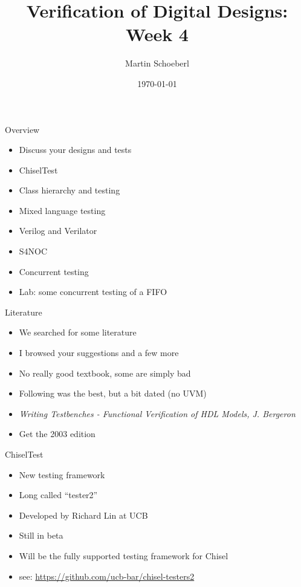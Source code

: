 

\newif\ifbook


\title{Verification of Digital Designs: Week 4}
\author{Martin Schoeberl}
\date{\today}



\begin{frame}
\titlepage
\end{frame}

\begin{frame}[fragile]{Overview}
\begin{itemize}
\item Discuss your designs and tests
\item ChiselTest
\item Class hierarchy and testing
\item Mixed language testing
\item Verilog and Verilator
\item S4NOC
\item Concurrent testing
\item Lab: some concurrent testing of a FIFO
\end{itemize}
\end{frame}

\begin{frame}[fragile]{Literature}
\begin{itemize}
\item We searched for some literature
\item I browsed your suggestions and a few more
\item No really good textbook, some are simply bad
\item Following was the best, but a bit dated (no UVM)
\item \emph{Writing Testbenches - Functional Verification of HDL Models, J. Bergeron}
\item Get the 2003 edition
\end{itemize}
\end{frame}

\begin{frame}[fragile]{ChiselTest}
\begin{itemize}
\item New testing framework
\item Long called ``tester2''
\item Developed by Richard Lin at UCB
\item Still in beta
\item Will be the fully supported testing framework for Chisel
\item see: \url{https://github.com/ucb-bar/chisel-testers2}
\end{itemize}
\end{frame}


